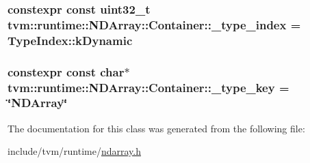\subsubsection[{\texorpdfstring{\+\_\+type\+\_\+index}{_type_index}}]{\setlength{\rightskip}{0pt plus 5cm}constexpr const uint32\+\_\+t tvm\+::runtime\+::\+N\+D\+Array\+::\+Container\+::\+\_\+type\+\_\+index = Type\+Index\+::k\+Dynamic\hspace{0.3cm}{\ttfamily [static]}}\hypertarget{classtvm_1_1runtime_1_1NDArray_1_1Container_a2aa70a8af3dcb461cad06e57ec3ad7b6}{}\label{classtvm_1_1runtime_1_1NDArray_1_1Container_a2aa70a8af3dcb461cad06e57ec3ad7b6}
\subsubsection[{\texorpdfstring{\+\_\+type\+\_\+key}{_type_key}}]{\setlength{\rightskip}{0pt plus 5cm}constexpr const char$\ast$ tvm\+::runtime\+::\+N\+D\+Array\+::\+Container\+::\+\_\+type\+\_\+key = \char`\"{}N\+D\+Array\char`\"{}\hspace{0.3cm}{\ttfamily [static]}}\hypertarget{classtvm_1_1runtime_1_1NDArray_1_1Container_a5f89a73ae36d22b46545cc5906e92a3d}{}\label{classtvm_1_1runtime_1_1NDArray_1_1Container_a5f89a73ae36d22b46545cc5906e92a3d}


The documentation for this class was generated from the following file\+:\begin{DoxyCompactItemize}
\item 
include/tvm/runtime/\hyperlink{ndarray_8h}{ndarray.\+h}\end{DoxyCompactItemize}
